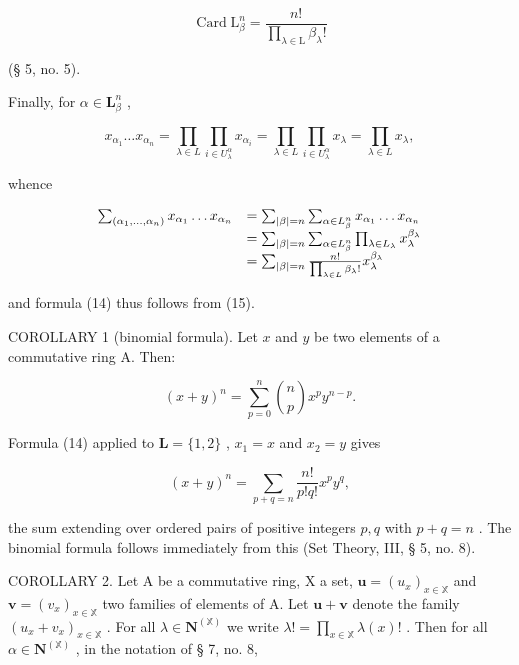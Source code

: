 \[
\operatorname{Card} \mathrm{L} _ {\beta} ^ {n} = \frac {n !}{\prod_ {\lambda \in \mathrm{L}} \beta_ {\lambda} !}
\]

(§ 5, no. 5).

Finally, for \(\alpha \in \mathbf{L}_{\beta}^{n}\) ,

\[
x _ {\alpha_ {1}} \dots x _ {\alpha_ {n}} = \prod_ {\lambda \in L} \prod_ {i \in U _ {\lambda} ^ {\alpha}} x _ {\alpha_ {i}} = \prod_ {\lambda \in L} \prod_ {i \in U _ {\lambda} ^ {\alpha}} x _ {\lambda} = \prod_ {\lambda \in L} x _ {\lambda},
\]

whence

\[
\begin{array}{r l} \sum_ {(\alpha_ {1}, \dots , \alpha_ {n})} x _ {\alpha_ {1}} \dots x _ {\alpha_ {n}} & = \sum_ {| \beta | = n} \sum_ {\alpha \in L _ {\beta} ^ {n}} x _ {\alpha_ {1}} \dots x _ {\alpha_ {n}} \\ & = \sum_ {| \beta | = n} \sum_ {\alpha \in L _ {\beta} ^ {n}} \prod_ {\lambda \in L _ {\lambda}} x _ {\lambda} ^ {\beta_ {\lambda}} \\ & = \sum_ {| \beta | = n} \frac {n !}{\prod_ {\lambda \in L} \beta_ {\lambda} !} x _ {\lambda} ^ {\beta_ {\lambda}} \end{array}
\]

and formula (14) thus follows from (15).

COROLLARY 1 (binomial formula). Let \(x\) and \(y\) be two elements of a commutative ring A. Then:

\[
(x + y) ^ {n} = \sum_ {p = 0} ^ {n} \binom {n} {p} x ^ {p} y ^ {n - p}.
\]

Formula (14) applied to \(\mathbf{L} = \{1,2\}\) , \(x_{1} = x\) and \(x_{2} = y\) gives

\[
(x + y) ^ {n} = \sum_ {p + q = n} \frac {n !}{p ! q !} x ^ {p} y ^ {q},
\]

the sum extending over ordered pairs of positive integers \(p, q\) with \(p + q = n\) . The binomial formula follows immediately from this (Set Theory, III, § 5, no. 8).

COROLLARY 2. Let A be a commutative ring, X a set, \(\mathbf{u} = (u_x)_{x \in \mathbb{X}}\) and \(\mathbf{v} = (v_x)_{x \in \mathbb{X}}\) two families of elements of A. Let \(\mathbf{u} + \mathbf{v}\) denote the family \((u_x + v_x)_{x \in \mathbb{X}}\) . For all \(\lambda \in \mathbf{N}^{(\mathbb{X})}\) we write \(\lambda! = \prod_{x \in \mathbb{X}} \lambda(x)!\) . Then for all \(\alpha \in \mathbf{N}^{(\mathbb{X})}\) , in the notation of § 7, no. 8,

